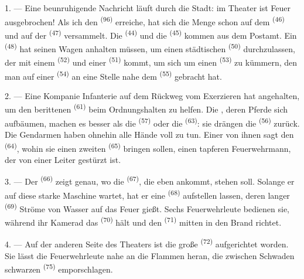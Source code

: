1. --- Eine beunruhigende Nachricht läuft durch die Stadt: im Theater ist Feuer
ausgebrochen! Als ich den  \textsuperscript{(96)} erreiche, hat sich die
Menge schon auf dem  \textsuperscript{(46)} und auf der
 \textsuperscript{(47)} versammelt. Die 
\textsuperscript{(44)} und die  \textsuperscript{(45)} kommen aus
dem Postamt. Ein  \textsuperscript{(48)} hat seinen Wagen
anhalten müssen, um einen städtischen  \textsuperscript{(50)}
durchzulassen, der mit einem  \textsuperscript{(52)} und einer
 \textsuperscript{(51)} kommt, um sich um einen
 \textsuperscript{(53)} zu kümmern, den man auf einer
 \textsuperscript{(54)} an eine Stelle nahe dem 
\textsuperscript{(55)} gebracht hat.

2. --- Eine Kompanie Infanterie auf dem Rückweg vom Exerzieren hat angehalten, um
den berittenen  \textsuperscript{(61)} beim Ordnungshalten zu
helfen. Die , deren Pferde sich aufbäumen, machen es besser als die
 \textsuperscript{(57)} oder die 
\textsuperscript{(63)}: sie drängen die  \textsuperscript{(56)}
zurück. Die
Gendarmen haben ohnehin alle Hände voll zu tun. Einer von ihnen sagt den
 \textsuperscript{(64)}, wohin sie einen zweiten
 \textsuperscript{(65)} bringen sollen, einen tapferen
Feuerwehrmann, der von einer Leiter gestürzt ist.

3. --- Der  \textsuperscript{(66)} zeigt genau, wo die
 \textsuperscript{(67)}, die eben ankommt, stehen soll. Solange
er auf diese starke Maschine wartet, hat er eine 
\textsuperscript{(68)} aufstellen lassen, deren langer 
\textsuperscript{(69)} Ströme von Wasser auf das Feuer gießt. Sechs Feuerwehrleute
bedienen sie, während ihr Kamerad das  \textsuperscript{(70)} hält
und den  \textsuperscript{(71)} mitten in den Brand richtet.

4. --- Auf der anderen Seite des Theaters ist die große 
\textsuperscript{(72)} aufgerichtet worden. Sie lässt die Feuerwehrleute nahe an die
Flammen heran, die zwischen Schwaden schwarzen 
\textsuperscript{(75)} emporschlagen.

